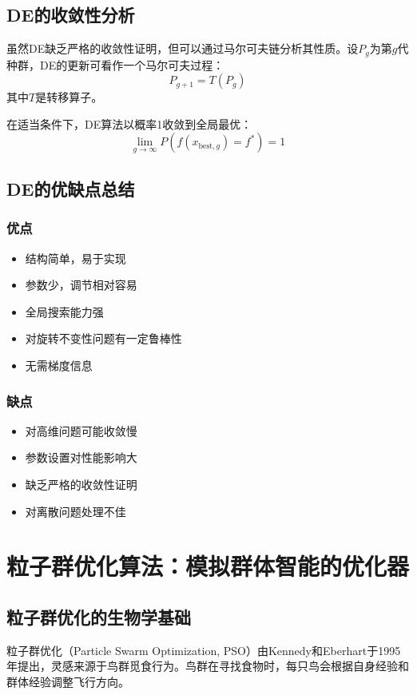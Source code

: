 \subsection{DE的收敛性分析}

虽然DE缺乏严格的收敛性证明，但可以通过马尔可夫链分析其性质。设$P_g$为第$g$代种群，DE的更新可看作一个马尔可夫过程：
\[
P_{g+1} = T(P_g)
\]
其中$T$是转移算子。

在适当条件下，DE算法以概率1收敛到全局最优：
\[
\lim_{g \to \infty} P(f(x_{\text{best},g}) = f^*) = 1
\]

\subsection{DE的优缺点总结}

\subsubsection{优点}
\begin{itemize}
    \item 结构简单，易于实现
    \item 参数少，调节相对容易
    \item 全局搜索能力强
    \item 对旋转不变性问题有一定鲁棒性
    \item 无需梯度信息
\end{itemize}

\subsubsection{缺点}
\begin{itemize}
    \item 对高维问题可能收敛慢
    \item 参数设置对性能影响大
    \item 缺乏严格的收敛性证明
    \item 对离散问题处理不佳
\end{itemize}

\section{粒子群优化算法：模拟群体智能的优化器}

\subsection{粒子群优化的生物学基础}

粒子群优化（Particle Swarm Optimization, PSO）由Kennedy和Eberhart于1995年提出，灵感来源于鸟群觅食行为。鸟群在寻找食物时，每只鸟会根据自身经验和群体经验调整飞行方向。

